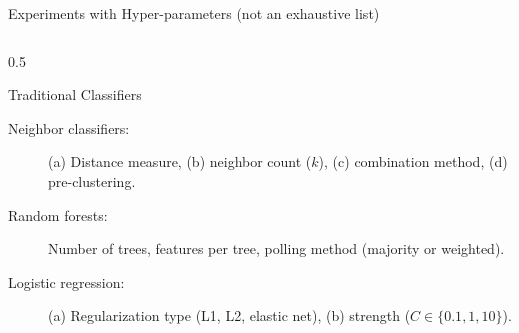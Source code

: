 \documentclass[10pt,aspectratio=169]{beamer}
\begin{document}
\begin{frame}[t]{Experiments with Hyper-parameters (not an exhaustive list)}
\begin{columns}[t]
\begin{column}{0.5\textwidth}
\begin{block}{\small Traditional Classifiers}
\begin{description}
\item[Neighbor classifiers:] (a) Distance measure, (b) neighbor count ($k$), (c) combination method, (d) pre-clustering.
\item[Random forests:] Number of trees, features per tree, polling method (majority or weighted).
\item[Logistic regression:] (a) Regularization type (L1, L2, elastic net), (b) strength ($C \in \{0.1, 1, 10\}$).
\end{description}
\end{block}
\end{column}
\end{columns}
\end{frame}
\end{document}
